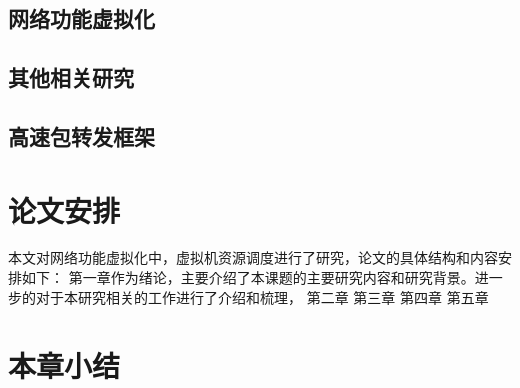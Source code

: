 \subsection{网络功能虚拟化}
\subsection{其他相关研究}
\subsection{高速包转发框架}

\section{论文安排}
本文对网络功能虚拟化中，虚拟机资源调度进行了研究，论文的具体结构和内容安排如下：
第一章作为绪论，主要介绍了本课题的主要研究内容和研究背景。进一步的对于本研究相关的工作进行了介绍和梳理，
第二章
第三章
第四章
第五章
\section{本章小结}
